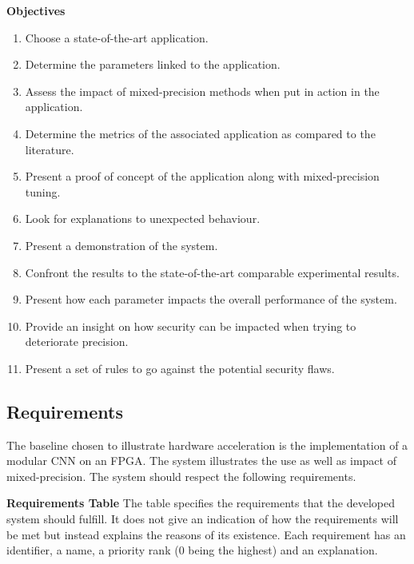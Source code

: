 \textbf{Objectives}

\begin{enumerate}
  \item Choose a state-of-the-art application.
  \item Determine the parameters linked to the application.
  \item Assess the impact of mixed-precision methods when put in action in the application.
  \item Determine the metrics of the associated application as compared to the literature.
  \item Present a proof of concept of the application along with mixed-precision tuning.
  \item Look for explanations to unexpected behaviour.
  \item Present a demonstration of the system.
  \item Confront the results to the state-of-the-art comparable experimental results.
  \item Present how each parameter impacts the overall performance of the system.
  \item Provide an insight on how security can be impacted when trying to deteriorate precision.
  \item Present a set of rules to go against the potential security flaws.
\end{enumerate}


\subsection{Requirements}

The baseline chosen to illustrate hardware acceleration is the implementation of a modular CNN on an FPGA. The system illustrates the use as well as impact of mixed-precision. The system should respect the following requirements.

\textbf{Requirements Table} The table specifies the requirements that the developed system should fulfill. It does not give an indication of how the requirements will be met but instead explains the reasons of its existence. Each requirement has an identifier, a name, a priority rank (0 being the highest) and an explanation.

